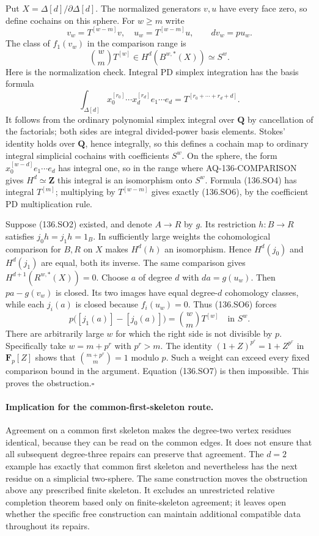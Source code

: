 Put $X=\Delta[d]/\partial\Delta[d]$.  The normalized generators
$v,u$ have every face zero, so define cochains on this sphere.
For $w\geq m$ write
\[
       v_w=T^{[w-m]}v,\quad u_w=T^{[w-m]}u,
                              \qquad dv_w=p u_w.          \tag{136.SO5}
\]
The class of $f_1(v_w)$ in the comparison range is
\[
            \binom wm T^{[w]}
                         \in H^d(B^{w,*}(X))\simeq S^w.  \tag{136.SO6}
\]
Here is the normalization check.  Integral PD simplex integration
has the basis formula
\[
 \int_{\Delta[d]}x_0^{[r_0]}\cdots x_d^{[r_d]}
                      e_1\cdots e_d
                           =T^{[r_0+\cdots+r_d+d]}.
\]
It follows from the ordinary polynomial simplex integral over
$\mathbf Q$ by cancellation of the factorials; both sides are
integral divided-power basis elements.  Stokes' identity holds
over $\mathbf Q$, hence integrally, so this defines a cochain map
to ordinary integral simplicial cochains with coefficients $S^w$.
On the sphere, the form $x_0^{[w-d]}e_1\cdots e_d$ has integral
one, so in the range where AQ-136-COMPARISON gives $H^d\simeq\mathbf Z$
this integral is an isomorphism onto $S^w$.  Formula (136.SO4)
has integral $T^{[m]}$; multiplying by $T^{[w-m]}$ gives exactly
(136.SO6), by the coefficient PD multiplication rule.

Suppose (136.SO2) existed, and denote $A\to R$ by $g$.
Its restriction $h:B\to R$ satisfies $j_0h=j_1h=1_B$.
In sufficiently large weights the cohomological comparison for
$B,R$ on $X$ makes $H^d(h)$ an isomorphism.  Hence $H^d(j_0)$
and $H^d(j_1)$ are equal, both its inverse.  The same comparison
gives $H^{d+1}(R^{w,*}(X))=0$.  Choose $a$ of degree $d$ with
$da=g(u_w)$.  Then $pa-g(v_w)$ is closed.  Its two images have
equal degree-$d$ cohomology classes, while each $j_i(a)$ is closed
because $f_i(u_w)=0$.  Thus (136.SO6) forces
\[
 p\bigl([j_1(a)]-[j_0(a)]\bigr)
                              =\binom wm T^{[w]}
                                    \quad\text{in }S^w.  \tag{136.SO7}
\]
There are arbitrarily large $w$ for which the right side is not
divisible by $p$.  Specifically take $w=m+p^r$ with $p^r>m$.
The identity $(1+Z)^{p^r}=1+Z^{p^r}$ in $\mathbf F_p[Z]$ shows
that $\binom{m+p^r}{m}=1$ modulo $p$.  Such a weight can exceed
every fixed comparison bound in the argument.  Equation (136.SO7)
is then impossible.  This proves the obstruction.\hfill$\square$

\paragraph{Implication for the common-first-skeleton route.}
Agreement on a common first skeleton makes the degree-two vertex
residues identical, because they can be read on the common edges.
It does not ensure that all subsequent degree-three repairs can
preserve that agreement.  The $d=2$ example has exactly that common
first skeleton and nevertheless has the next residue on a
simplicial two-sphere.  The same construction moves the obstruction
above any prescribed finite skeleton.  It excludes an unrestricted
relative completion theorem based only on finite-skeleton agreement;
it leaves open whether the specific free construction can maintain
additional compatible data throughout its repairs.
